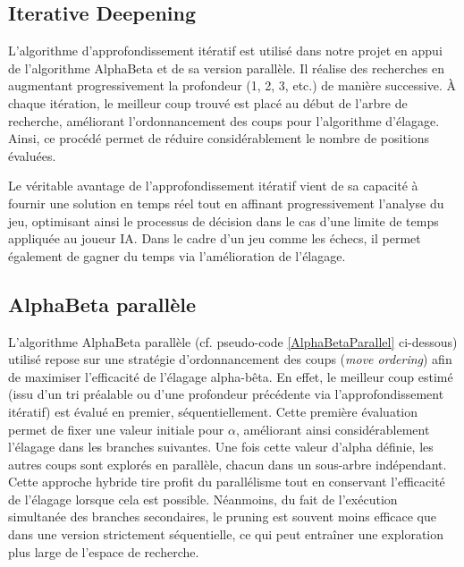 \documentclass{article}
\begin{document}
\subsection{Iterative Deepening}

L'algorithme d'approfondissement itératif est utilisé dans notre projet en appui de l'algorithme AlphaBeta et de sa version parallèle. Il réalise des recherches en augmentant progressivement la profondeur (1, 2, 3, etc.) de manière successive. À chaque itération, le meilleur coup trouvé est placé au début de l'arbre de recherche, améliorant l'ordonnancement des coups pour l'algorithme d'élagage. Ainsi, ce procédé permet de réduire considérablement le nombre de positions évaluées.

Le véritable avantage de l'approfondissement itératif vient de sa capacité à fournir une solution en temps réel tout en affinant progressivement l'analyse du jeu, optimisant ainsi le processus de décision dans le cas d'une limite de temps appliquée au joueur IA.
Dans le cadre d'un jeu comme les échecs, il permet également de gagner du temps via l'amélioration de l'élagage.

\subsection{AlphaBeta parallèle}

L'algorithme AlphaBeta parallèle (cf. pseudo-code \ref{AlphaBetaParallel} ci-dessous) utilisé repose sur une stratégie d'ordonnancement des coups (\textit{move ordering}) afin de maximiser l'efficacité de l'élagage alpha-bêta. En effet, le meilleur coup estimé (issu d'un tri préalable ou d'une profondeur précédente via l'approfondissement itératif) est évalué en premier, séquentiellement. Cette première évaluation permet de fixer une valeur initiale pour $\alpha$, améliorant ainsi considérablement l'élagage dans les branches suivantes. Une fois cette valeur d'alpha définie, les autres coups sont explorés en parallèle, chacun dans un sous-arbre indépendant.
Cette approche hybride tire profit du parallélisme tout en conservant l'efficacité de l'élagage lorsque cela est possible. Néanmoins, du fait de l'exécution simultanée des branches secondaires, le pruning est souvent moins efficace que dans une version strictement séquentielle, ce qui peut entraîner une exploration plus large de l'espace de recherche.
\end{document}
